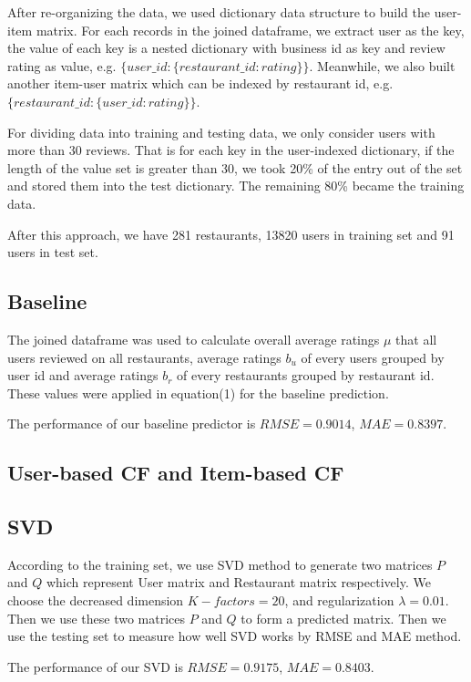 \documentclass{llncs}
\begin{document}
After re-organizing the data, we used dictionary data structure to build the user-item matrix. For each records in the joined dataframe, we extract user as the key, the value of each key is a nested dictionary with business id as key and review rating as value, e.g. $\{user\_id: \{restaurant\_id: rating\}\}$. Meanwhile, we also built another item-user matrix which can be indexed by restaurant id, e.g. $\{restaurant\_id: \{user\_id: rating\}\}$.

For dividing data into training and testing data, we only consider users with more than 30 reviews. That is for each key in the user-indexed dictionary, if the length of the value set is greater than 30, we took 20\% of the entry out of the set and stored them into the test dictionary. The remaining 80\% became the training data. 

After this approach, we have 281 restaurants, 13820 users in training set and 91 users in test set.
\subsection{Baseline}
The joined dataframe was used to calculate overall average ratings $\mu$ that all users reviewed on all restaurants, average ratings $b_u$ of every users grouped by user id and average ratings $b_r$ of every restaurants grouped by restaurant id. These values were applied in equation(1) for the baseline prediction.

The performance of our baseline predictor is $RMSE = 0.9014 $, $MAE = 0.8397$.
\subsection{User-based CF and Item-based CF}
\subsection{SVD}
According to the training set, we use SVD method to generate two matrices $P$ and $Q$ which represent User matrix and Restaurant matrix respectively. We choose the decreased dimension $K-factors = 20$, and regularization $\lambda = 0.01$. Then we use these two matrices $P$ and $Q$ to form a predicted matrix. Then we use the testing set to measure how well SVD works by RMSE and MAE method.

The performance of our SVD is $RMSE = 0.9175 $, $MAE = 0.8403$.
\end{document}
